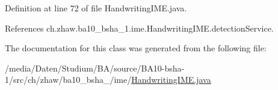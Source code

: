 Definition at line 72 of file HandwritingIME.java.

References ch.zhaw.ba10\_\-bsha\_\-1.ime.HandwritingIME.detectionService.

The documentation for this class was generated from the following file:\begin{DoxyCompactItemize}
\item 
/media/Daten/Studium/BA/source/BA10-\/bsha-\/1/src/ch/zhaw/ba10\_\-bsha\_/ime/\hyperlink{HandwritingIME_8java}{HandwritingIME.java}\end{DoxyCompactItemize}
